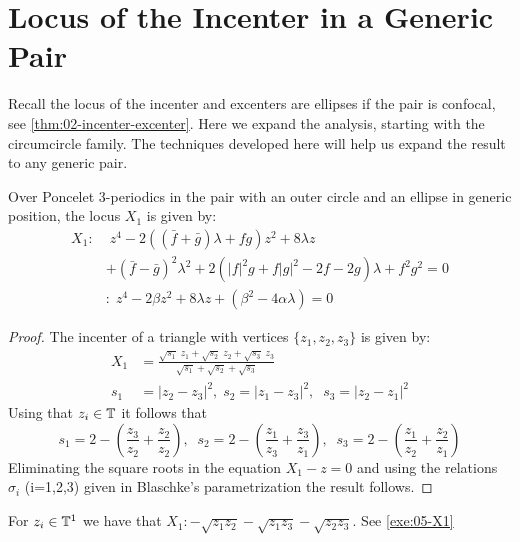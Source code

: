 \section{Locus of the Incenter in a Generic Pair}
\label{sec:07-proof-theorem}

Recall the locus of the incenter and excenters are ellipses if the pair is confocal, see \cref{thm:02-incenter-excenter}. Here we expand the analysis, starting with the circumcircle family. The techniques developed here will help us expand the result to any generic pair.

\begin{proposition}
\label{prop:07-X1c}
Over Poncelet 3-periodics in the pair with an outer circle and an ellipse in generic position, the locus $X_1$ is given by:
\begin{align*}
  X_1:&\;z^4 - 2(( \bar{f} + \bar{g}) \lambda +  f g) z^2 + 8   \lambda z\\
  &+ (\bar{f} - \bar{g})^2 \lambda^2 +2 (  |f|^2 g +   f |g|^2 - 2 f - 2 g) \lambda + f^2 g^2=0\\
  \;&:\;  z^4 - 2\beta  z^2+ 8\lambda z+  (\beta^2-4\alpha\lambda) =0
\end{align*}
\end{proposition}


\begin{proof} The incenter of a triangle with vertices $\{z_1,z_2,z_3\}$ is given by:
\begin{align*}
    X_1&=\frac{\sqrt{s_1}\;z_1+\sqrt{s_2}\;z_2+\sqrt{s_3}\;z_3}{\sqrt{s_1}+\sqrt{s_2}+\sqrt{s_3}}\\
    s_1&=|z_2-z_3|^2, \; s_2=|z_1-z_3|^2, \;\; s_3=|z_2-z_1|^2
\end{align*}
 Using that $z_i\in \mathbb{T}$ it follows that
 \[s_1=2-(\frac{z_3}{z_2}+\frac{z_2}{z_2}),\;\; s_2=2-(\frac{z_1}{z_3}+\frac{z_3}{z_1}),\;\;s_3=2-(\frac{z_1}{z_2}+\frac{z_2}{z_1})\]
Eliminating the square roots in  the equation $X_1-z=0$ and using the relations  $\sigma_i$ (i=1,2,3) given in Blaschke's parametrization the result follows.
\end{proof}

\begin{remark} For $z_i\in \mathbb{T}^1$ we have  that $ X_1: -\sqrt{z_1 z_2}-\sqrt{z_1z_3}-\sqrt{z_2z_3}$. See \ref{exe:05-X1}
\end{remark} 

